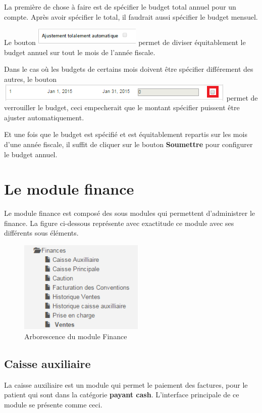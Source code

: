 \documentclass[12pt,a4paper]{report}
\begin{document}
La première de chose à faire est de spécifier le budget total annuel pour un compte.
Après avoir spécifier le total, il faudrait aussi spécifier le budget mensuel.

Le bouton \includegraphics[scale=0.7]{pic/AjustBudget.png} permet de diviser équitablement le budget annuel sur tout le mois de l'année fiscale.

Dans le cas où les budgets de certains mois doivent être spécifier différement des autres, le bouton \includegraphics[scale=0.7]{pic/BudgetGeler.png} permet de verrouiller le budget, ceci empecherait que le montant spécifier puissent être ajuster automatiquement.

Et une fois que le budget est spécifié et est équitablement repartis sur les mois d'une année fiscale, il suffit de cliquer sur le bouton \textbf{Soumettre} pour configurer le budget annuel.
\newpage
\chapter{Le module finance}        
Le module finance est composé des sous modules qui permettent d'administrer le finance. La figure ci-dessous représente avec exactitude ce module avec ses différents sous éléments.

\begin{figure}[h]
\begin{center}
\includegraphics[width=6cm]{pic/FinanceArbo.png}
\end{center}
\caption{Arborescence du module Finance}
\label{Arborescence du module Finance}
\end{figure}

\newpage
\section{Caisse auxiliaire}
La caisse auxiliaire est un module qui permet le paiement des factures, pour le patient qui sont dans la catégorie \textbf{payant cash}. L'interface principale de ce module se présente comme ceci.
\end{document}
